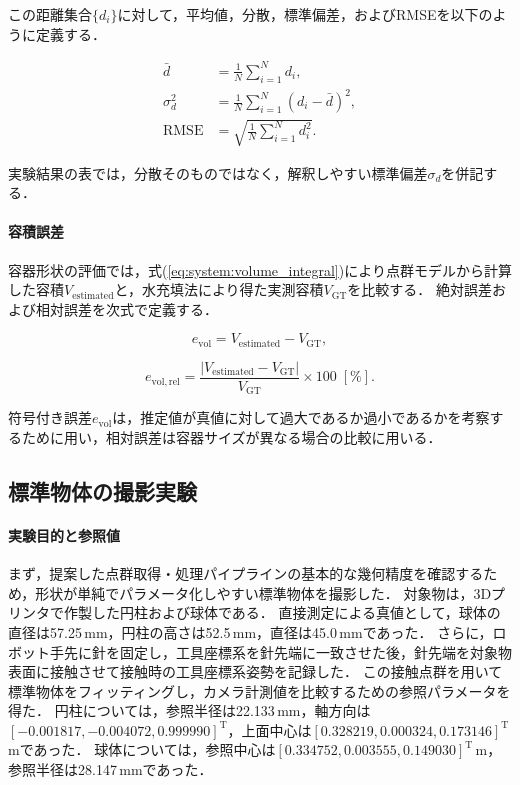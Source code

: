 この距離集合$\{d_i\}$に対して，平均値，分散，標準偏差，およびRMSEを以下のように定義する．

\begin{align}
  \bar{d} &= \frac{1}{N}\sum_{i=1}^{N}d_i, \\
  \sigma_d^2 &= \frac{1}{N}\sum_{i=1}^{N}(d_i-\bar{d})^2, \\
  \mathrm{RMSE} &= \sqrt{\frac{1}{N}\sum_{i=1}^{N}d_i^2}.
  \label{eq:system:distance_statistics}
\end{align}

実験結果の表では，分散そのものではなく，解釈しやすい標準偏差$\sigma_d$を併記する．

\paragraph{容積誤差}

容器形状の評価では，式(\ref{eq:system:volume_integral})により点群モデルから計算した容積$V_{\mathrm{estimated}}$と，水充填法により得た実測容積$V_{\mathrm{GT}}$を比較する．
絶対誤差および相対誤差を次式で定義する．

\begin{equation}
  e_{\mathrm{vol}} = V_{\mathrm{estimated}}-V_{\mathrm{GT}},
  \label{eq:system:vol_error}
\end{equation}

\begin{equation}
  e_{\mathrm{vol,rel}} = \frac{|V_{\mathrm{estimated}}-V_{\mathrm{GT}}|}{V_{\mathrm{GT}}}\times100\;[\%].
  \label{eq:system:vol_error_rel}
\end{equation}

符号付き誤差$e_{\mathrm{vol}}$は，推定値が真値に対して過大であるか過小であるかを考察するために用い，相対誤差は容器サイズが異なる場合の比較に用いる．

\subsection{標準物体の撮影実験}
\label{sec:system:pointcloud:evaluation:standard-objects}

\paragraph{実験目的と参照値}

まず，提案した点群取得・処理パイプラインの基本的な幾何精度を確認するため，形状が単純でパラメータ化しやすい標準物体を撮影した．
対象物は，3Dプリンタで作製した円柱および球体である．
直接測定による真値として，球体の直径は57.25\,mm，円柱の高さは52.5\,mm，直径は45.0\,mmであった．
さらに，ロボット手先に針を固定し，工具座標系を針先端に一致させた後，針先端を対象物表面に接触させて接触時の工具座標系姿勢を記録した．
この接触点群を用いて標準物体をフィッティングし，カメラ計測値を比較するための参照パラメータを得た．
円柱については，参照半径は22.133\,mm，軸方向は$[-0.001817, -0.004072, 0.999990]^{\mathrm{T}}$，上面中心は$[0.328219, 0.000324, 0.173146]^{\mathrm{T}}$\,mであった．
球体については，参照中心は$[0.334752, 0.003555, 0.149030]^{\mathrm{T}}$\,m，参照半径は28.147\,mmであった．

